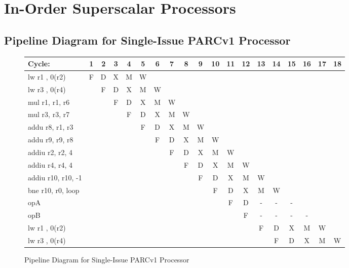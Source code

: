 \documentclass[10pt]{article}
\begin{document}
\cleardoublepage
\section{In-Order Superscalar Processors}

\subsection{Pipeline Diagram for Single-Issue PARCv1 Processor}

\begin{figure}[H]
\centering
{\setlength{\tabcolsep}{2pt}
\begin{tabular}{|l|c|c|c|c!{\vrule width 1.5pt}c|c|c|c|c|c|c|c|c|c|c|c!{\vrule width 1.5pt}c|c|}
\hline
Cycle:            & 1 & 2 & 3 & 4 & 5 & 6 & 7 & 8 & 9 & 10 & 11 & 12 & 13 & 14 & 15 & 16 & 17 & 18 \\ \hline
lw r1 , 0(r2)     & F & D & X & M & W &   &   &   &   &    &    &    &    &    &    &    &    &    \\ \hline
lw r3 , 0(r4)     &   & F & D & X & M & W &   &   &   &    &    &    &    &    &    &    &    &    \\ \hline
mul r1, r1, r6    &   &   & F & D & X & M & W &   &   &    &    &    &    &    &    &    &    &    \\ \hline
mul r3, r3, r7    &   &   &   & F & D & X & M & W &   &    &    &    &    &    &    &    &    &    \\ \hline
addu r8, r1, r3   &   &   &   &   & F & D & X & M & W &    &    &    &    &    &    &    &    &    \\ \hline
addu r9, r9, r8   &   &   &   &   &   & F & D & X & M & W  &    &    &    &    &    &    &    &    \\ \hline
addiu r2, r2, 4   &   &   &   &   &   &   & F & D & X & M  & W  &    &    &    &    &    &    &    \\ \hline
addiu r4, r4, 4   &   &   &   &   &   &   &   & F & D & X  & M  & W  &    &    &    &    &    &    \\ \hline
addiu r10, r10, -1&   &   &   &   &   &   &   &   & F & D  & X  & M  & W  &    &    &    &    &    \\ \hline
bne r10, r0, loop &   &   &   &   &   &   &   &   &   & F  & D  & X  & M  & W  &    &    &    &    \\ \hline
opA               &   &   &   &   &   &   &   &   &   &    & F  & D  & -  & -  & -  &    &    &    \\ \hline
opB               &   &   &   &   &   &   &   &   &   &    &    & F  & -  & -  & -  & -  &    &    \\ \hline
lw r1 , 0(r2)     &   &   &   &   &   &   &   &   &   &    &    &    & F  & D  & X  & M  & W  &    \\ \hline
lw r3 , 0(r4)     &   &   &   &   &   &   &   &   &   &    &    &    &    & F  & D  & X  & M  & W  \\ \hline
\end{tabular}
}
\caption{Pipeline Diagram for Single-Issue PARCv1 Processor}
\end{figure}
\end{document}
